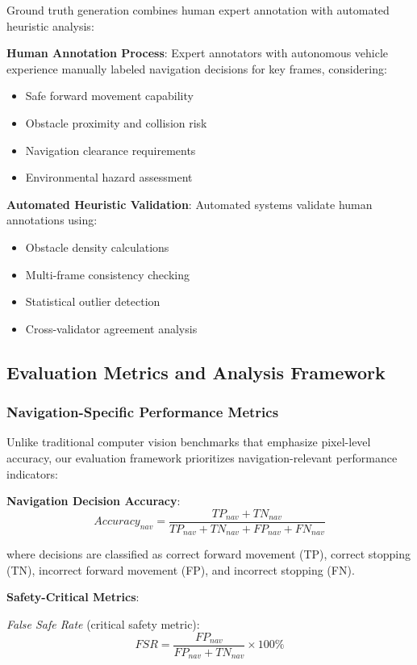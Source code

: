 \documentclass[10pt]{article}
\begin{document}
Ground truth generation combines human expert annotation with automated heuristic analysis:

\textbf{Human Annotation Process}:
Expert annotators with autonomous vehicle experience manually labeled navigation decisions for key frames, considering:
\begin{itemize}
\item Safe forward movement capability
\item Obstacle proximity and collision risk
\item Navigation clearance requirements
\item Environmental hazard assessment
\end{itemize}

\textbf{Automated Heuristic Validation}:
Automated systems validate human annotations using:
\begin{itemize}
\item Obstacle density calculations
\item Multi-frame consistency checking
\item Statistical outlier detection
\item Cross-validator agreement analysis
\end{itemize}

\subsection{Evaluation Metrics and Analysis Framework}

\subsubsection{Navigation-Specific Performance Metrics}

Unlike traditional computer vision benchmarks that emphasize pixel-level accuracy, our evaluation framework prioritizes navigation-relevant performance indicators:

\textbf{Navigation Decision Accuracy}:
\begin{equation}
Accuracy_{nav} = \frac{TP_{nav} + TN_{nav}}{TP_{nav} + TN_{nav} + FP_{nav} + FN_{nav}}
\end{equation}

where decisions are classified as correct forward movement (TP), correct stopping (TN), incorrect forward movement (FP), and incorrect stopping (FN).

\textbf{Safety-Critical Metrics}:

\textit{False Safe Rate} (critical safety metric):
\begin{equation}
FSR = \frac{FP_{nav}}{FP_{nav} + TN_{nav}} \times 100\%
\end{equation}
\end{document}
